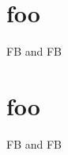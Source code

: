 \documentclass{scrartcl}
\begin{document}
\section{foo}
\ac{FB} and \ac{FB}

\section{foo}
\ac{FB} and \ac{FB}
\end{document}
